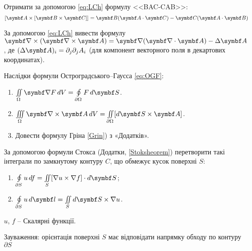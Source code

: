 \begin{problem}%
Отримати за допомогою \eqref{eq:LCh} формулу <<BAC-CAB>>:
\[
 [\vect{A} \times [ \vect{B} \times  \vect{C}]] =  \vect{B}( \vect{A} \cdot  \vect{C}) -  \vect{C}( \vect{A} \cdot  \vect{B})
\]
\end{problem}



\begin{problem}
За допомогою \eqref{eq:LCh} вивести формулу $\vect{\nabla} \times (\vect{\nabla} \times \vect{A}) = \vect{\nabla}(\vect{\nabla} \cdot \vect{A}) - \Delta \vect{A}$, де $(\Delta \vect{A})_i = \partial_j \partial_j A_i$ (для компонент векторного поля в декартових координатах).
\end{problem}

\begin{problem}
Наслідки формули Остроградського–Гаусса \eqref{eq:OGF}:
\begin{enumerate}[label=\alph*)]
\item $\iint\limits_{\Omega} \vect{\nabla} F \, dV = \oint\limits_{\partial\Omega} F \, d\vect{S}$.
\item $\iiint\limits_{\Omega} \rot \vect{A} \, dV = \iint\limits_{\partial\Omega} [d\vect{S} \times \vect{A}]$.
\item Довести формулу Гріна \eqref{Grin}) з «Додатків».
\end{enumerate}
\end{problem}

\begin{problem}%
За допомогою формули Стокса (Додатки, \eqref{Stoksheorem}) перетворити такі інтеграли по замкнутому контуру $C$, що обмежує кусок поверхні $S$:
\begin{enumerate}[label=\alph*)]
\item $\oint\limits_{\partial S} u \, df = \iint\limits_{S} [\nabla u \times \nabla f] \cdot d\vect{S}$;
\item $\oint\limits_{\partial S} u \, d\vect{l} = \iint\limits_{S} d\vect{S} \times \nabla u$.
\end{enumerate}
$u$, $f$ -- Скалярні функції.

Зауваження: орієнтація поверхні $S$ має відповідати напрямку обходу по контуру $\partial S$
\end{problem}



